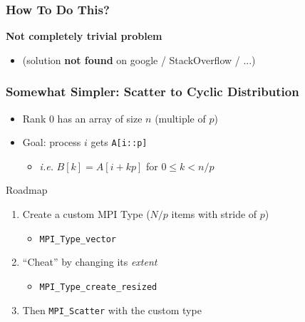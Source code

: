 \documentclass[xcolor={rgb,x11names,svgnames},rgb,x11names,svgnames]{beamer}
\begin{document}
\begin{frame}[label=conversion]
\frametitle{How To Do This?}
  \vfill
  \begin{alertblock}{\textbf{Not completely trivial problem}}
    \begin{itemize}
    \item (solution \textbf{not found} on google / StackOverflow / ...)
    \end{itemize}
  \end{alertblock}
  \vfill
\end{frame}


\begin{frame}[label=cyclic]
  \frametitle{Somewhat Simpler: \textbf{Scatter} to Cyclic Distribution}

  \begin{itemize}
  \item Rank 0 has an array of size $n$ (multiple of $p$)
  \item Goal: process $i$ gets \texttt{A[i::p]}
    \begin{itemize}
    \item \textit{i.e.} $B[k] = A[i + kp]$ for $0 \leq k < n/p$
    \end{itemize}
  \end{itemize}
  
  \medskip

  \begin{block}{Roadmap}
    \begin{enumerate}
    \item Create a custom MPI Type ($N/p$ items with stride of $p$)
      \begin{itemize}
      \item \texttt{MPI_Type_vector}
      \end{itemize}
      
    \item ``Cheat'' by changing its \emph{extent} 
      \begin{itemize}
      \item \texttt{MPI_Type_create_resized}
      \end{itemize}
      
    \item Then \texttt{MPI_Scatter} with the custom type
    \end{enumerate}
  \end{block}
\end{frame}
\end{document}
